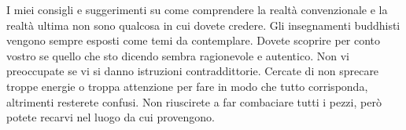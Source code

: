 I miei consigli e suggerimenti su come comprendere la realtà convenzionale e la realtà ultima non sono qualcosa in cui dovete credere. Gli insegnamenti buddhisti vengono sempre esposti come temi da contemplare. Dovete scoprire per conto vostro se quello che sto dicendo sembra ragionevole e autentico. Non vi preoccupate se vi si danno istruzioni contraddittorie. Cercate di non sprecare troppe energie o troppa attenzione per fare in modo che tutto corrisponda, altrimenti resterete confusi. Non riuscirete a far combaciare tutti i pezzi, però potete recarvi nel luogo da cui provengono.

